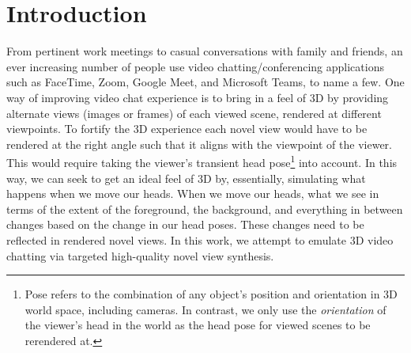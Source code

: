 \chapter{Introduction}\label{ch1:introduction}
 
From pertinent work meetings to casual conversations with family and friends, an ever increasing number of people use video chatting/conferencing applications such as FaceTime, Zoom, Google Meet, and Microsoft Teams, to name a few. One way of improving video chat experience is to bring in a feel of 3D by providing alternate views (images or frames) of each viewed scene, rendered at different viewpoints. To fortify the 3D experience each novel view would have to be rendered at the right angle such that it aligns with the viewpoint of the viewer. This would require taking the viewer's transient head pose\footnote{Pose refers to the combination of any object's position and orientation in 3D world space, including cameras. In contrast, we only use the \textit{orientation} of the viewer's head in the world as the head pose for viewed scenes to be rerendered at.} into account. In this way, we can seek to get an ideal feel of 3D by, essentially, simulating what happens when we move our heads. When we move our heads, what we see in terms of the extent of the foreground, the background, and everything in between changes based on the change in our head poses. These changes need to be reflected in rendered novel views. In this work, we attempt to emulate 3D video chatting via targeted high-quality novel view synthesis.



